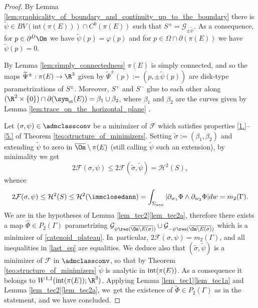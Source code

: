 \begin{proof}
By Lemma \ref{lem:graphicality_of_boundary_and_continuity_up_to_the_boundary}
there is $\widetilde \psi\in BV(\mathrm{int}(\pi(E)))\cap C^0(\pi(E))$ such that $S^\pm=
\mathcal {G}_{\pm\widetilde\psi}$.
As a consequence, for $p\in \partial^D\Om$
we have $\widetilde\psi(p)=\varphi(p)$ and for $p\in\Omega\cap \partial (\pi(E))$
we have $\widetilde\psi(p)=0$.

By Lemma \ref{lem:simply_connectedness} $\pi(E)$ is simply connected, and so
the maps $\widetilde \Psi^\pm:\pi(E)\to \R^3$ given by
$\widetilde \Psi^\pm(p):=(p,\pm\widetilde\psi(p))$ are disk-type parametrizations of $S^\pm$.
Moreover, $S^+$ and $S^-$ glue to each other along
$(\R^2\times\{0\})\cap\partial(\sym_\mathrm{st}(E))=
\beta_1\cup\beta_2$, where $\beta_1$ and $\beta_2$
are the curves given by Lemma \ref{lem:trace_on_the_horizontal_plane} .

Let $(\sigma,\psi)\in\admclassconv$ be a minimizer of $\mathcal F$ which satisfies
properties \ref{1.}--\ref{5.} of Theorem \ref{teo:structure_of_minimizers}. Setting $\widetilde\sigma:=(\beta_1,\beta_2)$ and
extending $\widetilde\psi$ to zero in $\overline\Om\setminus \pi(E)$
(still calling $\widetilde \psi$ such an extension),
by minimality we get
\[
2\mathcal F(\sigma,\psi)\leq 2\mathcal F(\widetilde\sigma,\widetilde\psi)=\mathcal H^2(S),
\]
whence
\begin{align}\label{last_eq}
2\mathcal F(\sigma,\psi)\leq \mathcal{H}^2(S)\le\mathcal{H}^2(\immclosedann)
=\int_{\Sigma_{\mathrm{ann}}}|\partial_{w_1}\Phi\wedge\partial_{w_2}\Phi|dw=m_2(\Gamma).
\end{align}
We are in the hypotheses of Lemma \ref{lem_tec2}\ref{lem_tec2a},
therefore there exists a map $\widehat\Phi\in P_2(\Gamma)$ parametrizing $\mathcal G_{\psi\res(\overline{\Om\setminus E(\sigma)})}\cup \mathcal G_{-\psi\res(\overline{\Om\setminus E(\sigma)})}$ which is a minimizer
of \eqref{catenoid_plateau}. In~particular,
$2\mathcal F(\sigma,\psi)=m_2(\Gamma)$, and all inequalities in \eqref{last_eq} are equalities. We
deduce also that
$(\widetilde \sigma,\widetilde\psi)$ is a minimizer of $\mathcal F$ in $\admclassconv$, so that by Theorem \ref{teo:structure_of_minimizers} $\widetilde \psi$ is analytic in $\textup{int}(\pi(E))$. As a consequence it belongs to $W^{1,1}(\textup{int}(\pi(E));\R^3)$.
Applying Lemma \ref{lem_tec1}\ref{lem_tec1a} and Lemma \ref{lem_tec2}\ref{lem_tec2a}, we~get the existence of $\widetilde \Phi\in P_2(\Gamma)$ as in the statement, and we have concluded.
\end{proof}

